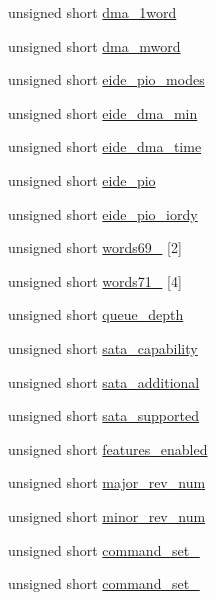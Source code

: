 \begin{DoxyCompactItemize}
\item 
unsigned short \hyperlink{structSATA__ident_a5a7cbcc17497c2cb6bfc6a79c7bca798}{dma\+\_\+1word}
\item 
unsigned short \hyperlink{structSATA__ident_a3baea9abdcd9f21814c53094b1037f43}{dma\+\_\+mword}
\item 
unsigned short \hyperlink{structSATA__ident_ae833370217f85d6eaafd82f290cfebd4}{eide\+\_\+pio\+\_\+modes}
\item 
unsigned short \hyperlink{structSATA__ident_a298cef7737e82b93d37c519b06fe3d37}{eide\+\_\+dma\+\_\+min}
\item 
unsigned short \hyperlink{structSATA__ident_a63768c1ba04a1ca34944e34cbf4239fa}{eide\+\_\+dma\+\_\+time}
\item 
unsigned short \hyperlink{structSATA__ident_a4a56a283b3953bbf7319c35b6ef38654}{eide\+\_\+pio}
\item 
unsigned short \hyperlink{structSATA__ident_a884661c28a77066fb1968a432a48dc80}{eide\+\_\+pio\+\_\+iordy}
\item 
unsigned short \hyperlink{structSATA__ident_a92889f3e742cf5d85af65e26a83701c0}{words69\+\_} \mbox{[}2\mbox{]}
\item 
unsigned short \hyperlink{structSATA__ident_a6cc31fab7053c53b3797051c0d9013a8}{words71\+\_} \mbox{[}4\mbox{]}
\item 
unsigned short \hyperlink{structSATA__ident_adcc438f4fea20d3923975c215a3b4bdb}{queue\+\_\+depth}
\item 
unsigned short \hyperlink{structSATA__ident_aa8bd934743b5ee069527b69a0b03d0a0}{sata\+\_\+capability}
\item 
unsigned short \hyperlink{structSATA__ident_ac397fd6793b8efa1f3e3c743ae3ab8d6}{sata\+\_\+additional}
\item 
unsigned short \hyperlink{structSATA__ident_abbd1fd98f82be0ce8e3278f63065f886}{sata\+\_\+supported}
\item 
unsigned short \hyperlink{structSATA__ident_aff86049b3b642c906338107dd9a72578}{features\+\_\+enabled}
\item 
unsigned short \hyperlink{structSATA__ident_a20072f19c069ac7fd06c1b1b35cac9cf}{major\+\_\+rev\+\_\+num}
\item 
unsigned short \hyperlink{structSATA__ident_a43a70eb59b8388d13f79d3b02b0a7c51}{minor\+\_\+rev\+\_\+num}
\item 
unsigned short \hyperlink{structSATA__ident_af94e7c7a492cbcd4586315ffea27076a}{command\+\_\+set\+\_}
\item 
unsigned short \hyperlink{structSATA__ident_a2392729304479e06e003afc3578b3b34}{command\+\_\+set\+\_}

\end{DoxyCompactItemize}

